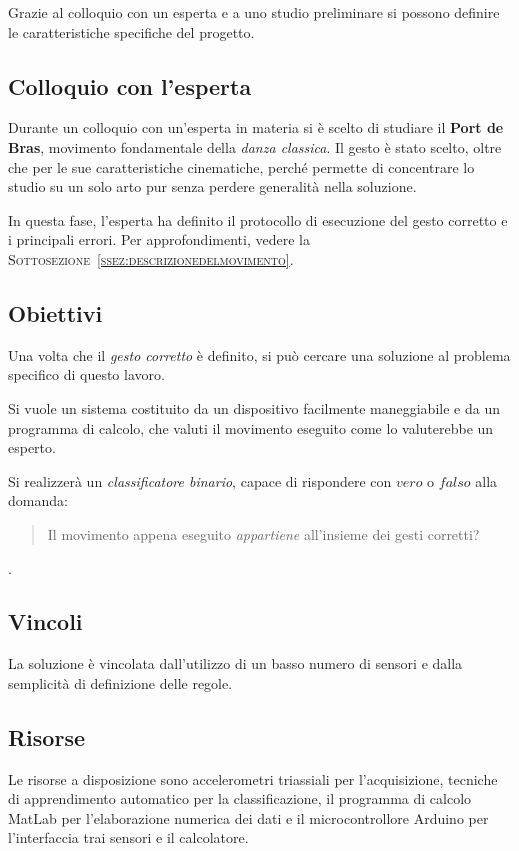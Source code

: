 
Grazie al colloquio con un esperta e a uno studio preliminare
si possono definire le caratteristiche specifiche del progetto. 

\subsection{Colloquio con l'esperta}
Durante un colloquio con un'esperta in materia
si è scelto di studiare il \textbf{Port de Bras},
movimento fondamentale della \emph{danza classica}.
Il gesto è stato scelto,
oltre che per le sue caratteristiche cinematiche,
perché permette di concentrare lo studio su un solo arto
pur senza perdere generalità nella soluzione.

In questa fase, l'esperta ha definito il protocollo di esecuzione
del gesto corretto e i principali errori.
Per approfondimenti, vedere la \textsc{Sottosezione~\ref{ssez:descrizionedelmovimento}}.




\subsection{Obiettivi}
Una volta che il \emph{gesto corretto} è definito,
si può cercare una soluzione al problema specifico di questo lavoro.

Si vuole un sistema
costituito da un dispositivo facilmente maneggiabile
e da un programma di calcolo,
che valuti il movimento eseguito
come lo valuterebbe un esperto.

Si realizzerà un \emph{classificatore binario},
capace di rispondere con $vero$ o $falso$
alla domanda:
\begin{quote}
Il movimento appena eseguito \emph{appartiene} all'insieme dei gesti corretti?
\end{quote}.




\subsection{Vincoli}
La soluzione è vincolata dall'utilizzo di un basso numero di sensori
e dalla semplicità di definizione delle regole.




\subsection{Risorse}

Le risorse a disposizione sono accelerometri triassiali per l'acquisizione,
tecniche di apprendimento automatico per la classificazione,
il programma di calcolo MatLab per l'elaborazione numerica dei dati
e il microcontrollore Arduino per l'interfaccia trai sensori e il calcolatore.
